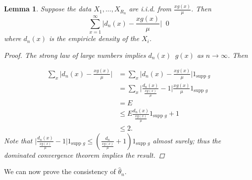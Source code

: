 \documentclass[11 pt]{article}
\newtheorem{lem}{Lemma}
\renewcommand{\th}{\theta}
\newcommand{\xra}[1]{\mathop{ \xrightarrow{#1} }}
\newcommand{\fbr}[1]{ \mathop{ \left\{ #1 \right\} } }
\newcommand{\gs}{\frac{xg(x)}{\mu}}
\newcommand{\mhde}{\hat{\th}_n}
\begin{document}
\begin{lem} Suppose the data $X_1,...,X_{R_n}$ are i.i.d. from $\gs$. Then
\[
\sum_{x=1}^{\infty} \bigg|d_n(x) - \gs \bigg| \xra{a.s.} 0
\]
where $d_n(x)$ is the empiricle density of the $X_i$.
\label{lem:loneas}
\begin{proof}
The strong law of large numbers implies $d_n(x) \xra{a.s.} g(x)$ as $n \rightarrow \infty$. Then

\begin{align*}
\sum_x \bigg|d_n(x) - \gs \bigg| &= \sum_x \bigg |d_n(x) - \gs \bigg |1_{\text{supp } g} \\
&= \sum_x \bigg |\frac{d_n(x)}{\gs} - 1 \bigg | \gs 1_{\text{supp } g} \\
&= E \fbr{\bigg |\frac{d_n(x)}{\gs} - 1 \bigg | 1_{\text{supp } g} }\\
&\leq E \frac{d_n(x)}{\gs}1_{\text{supp } g}  + 1 \\
&\leq 2.
\end{align*}
Note that $\bigg |\frac{d_n(x)}{\gs} - 1 \bigg |1_{\text{supp } g} \leq (\frac{d_n}{\gs} + 1)1_{\text{supp } g}$ almost surely; thus the dominated convergence theorem implies the result.
\end{proof}
\end{lem}


We can now prove the consistency of $\mhde$.
\end{document}
